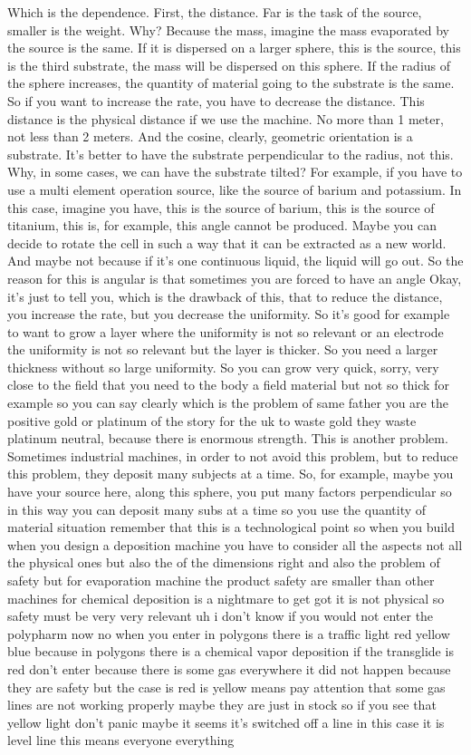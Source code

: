 Which is the dependence. First, the distance. Far is the task of the source, smaller is the weight. Why? Because the mass, imagine the mass evaporated by the source is the same. If it is dispersed on a larger sphere, this is the source, this is the third substrate, the mass will be dispersed on this sphere. If the radius of the sphere increases, the quantity of material going to the substrate is the same. So if you want to increase the rate, you have to decrease the distance. This distance is the physical distance if we use the machine. No more than 1 meter, not less than 2 meters. And the cosine, clearly, geometric orientation is a substrate. It's better to have the substrate perpendicular to the radius, not this. Why, in some cases, we can have the substrate tilted? For example, if you have to use a multi element operation source, like the source of barium and potassium. In this case, imagine you have, this is the source of barium, this is the source of titanium, this is, for example, this angle cannot be produced. Maybe you can decide to rotate the cell in such a way that it can be extracted as a new world. And maybe not because if it's one continuous liquid, the liquid will go out. So the reason for this is angular is that sometimes you are forced to have an angle Okay, it's just to tell you, which is the drawback of this, that to reduce the distance, you increase the rate, but you decrease the uniformity. So it's good for example to want to grow a layer where the uniformity is not so relevant or an electrode the uniformity is not so relevant but the layer is thicker. So you need a larger thickness without so large uniformity. So you can grow very quick, sorry, very close to the field that you need to the body a field material but not so thick for example so you can say clearly which is the problem of same father you are the positive gold or platinum of the story for the uk to waste gold they waste platinum neutral, because there is enormous strength. This is another problem. Sometimes industrial machines, in order to not avoid this problem, but to reduce this problem, they deposit many subjects at a time. So, for example, maybe you have your source here, along this sphere, you put many factors perpendicular so in this way you can deposit many subs at a time so you use the quantity of material situation remember that this is a technological point so when you build when you design a deposition machine you have to consider all the aspects not all the physical ones but also the of the dimensions right and also the problem of safety but for evaporation machine the product safety are smaller than other machines for chemical deposition is a nightmare to get got it is not physical so safety must be very very relevant uh i don't know if you would not enter the polypharm now no when you enter in polygons there is a traffic light red yellow blue because in polygons there is a chemical vapor deposition if the transglide is red don't enter because there is some gas everywhere it did not happen because they are safety but the case is red is yellow means pay attention that some gas lines are not working properly maybe they are just in stock so if you see that yellow light don't panic maybe it seems it's switched off a line in this case it is level line this means everyone everything 